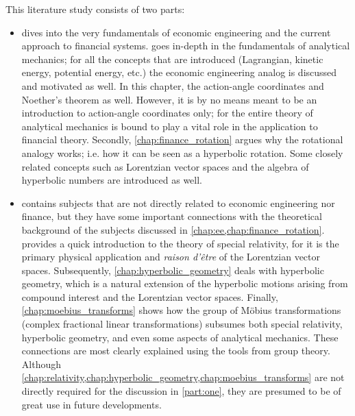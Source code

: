 This literature study consists of two parts: 
\begin{itemize}
    \item \textbf{} dives into the very fundamentals of economic engineering and the current approach to financial systems.  goes in-depth in the fundamentals of analytical mechanics; for all the concepts that are introduced (Lagrangian, kinetic energy, potential energy, etc.) the economic engineering analog is discussed and motivated as well. In this chapter, the action-angle coordinates and Noether's theorem as well. However, it is by no means meant to be an introduction to action-angle coordinates only; for the entire theory of analytical mechanics is bound to play a vital role in the application to financial theory. Secondly, \cref{chap:finance_rotation} argues why the rotational analogy works; i.e. how it can be seen as a hyperbolic rotation. Some closely related concepts such as Lorentzian vector spaces and the algebra of hyperbolic numbers are introduced as well.
    \item \textbf{} contains subjects that are not directly related to economic engineering nor finance, but they have some important connections with the theoretical background of the subjects discussed in \cref{chap:ee,chap:finance_rotation}.  provides a quick introduction to the theory of special relativity, for it is the primary physical application and \emph{raison d'être} of the Lorentzian vector spaces. Subsequently, \cref{chap:hyperbolic_geometry} deals with hyperbolic geometry, which is a natural extension of the hyperbolic motions arising from compound interest and the Lorentzian vector spaces. Finally, \cref{chap:moebius_transforms} shows how the group of Möbius transformations (complex fractional linear transformations) subsumes both special relativity, hyperbolic geometry, and even some aspects of analytical mechanics. These connections are most clearly explained using the tools from group theory. Although \cref{chap:relativity,chap:hyperbolic_geometry,chap:moebius_transforms} are not directly required for the discussion in \cref{part:one}, they are presumed to be of great use in future developments.
\end{itemize}



